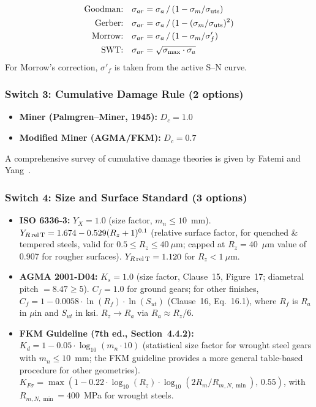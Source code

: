 \documentclass[twocolumn,12pt,a4paper]{article}
\begin{document}
\begin{subequations}\label{eq:mean_stress}
\begin{align}
\text{Goodman:}\quad
  \sigma_{ar} &= \sigma_a \,/\, (1 - \sigma_m/\sigma_{\rm uts})
  \label{eq:goodman} \\
\text{Gerber:}\quad
  \sigma_{ar} &= \sigma_a \,/\, (1 - (\sigma_m/\sigma_{\rm uts})^2)
  \label{eq:gerber} \\
\text{Morrow:}\quad
  \sigma_{ar} &= \sigma_a \,/\, (1 - \sigma_m/\sigma'_f)
  \label{eq:morrow} \\
\text{SWT:}\quad
  \sigma_{ar} &= \sqrt{\sigma_{\max} \cdot \sigma_a}
  \label{eq:swt}
\end{align}
\end{subequations}
For Morrow's correction, $\sigma'_f$ is taken from the active S--N
curve.

\subsubsection{Switch 3: Cumulative Damage Rule (2 options)}

\begin{itemize}
  \item \textbf{Miner (Palmgren--Miner, 1945):} $D_c = 1.0$
  \item \textbf{Modified Miner (AGMA/FKM):} $D_c = 0.7$
\end{itemize}
A comprehensive survey of cumulative damage theories is given by Fatemi and Yang~\cite{fatemi1998}.

\subsubsection{Switch 4: Size and Surface Standard (3 options)}

\begin{itemize}
  \item \textbf{ISO 6336-3:} $Y_X = 1.0$ (size factor, $m_n \leq 10$~mm).
        $Y_{R\,\rm rel\,T} = 1.674 - 0.529(R_z+1)^{0.1}$ (relative
        surface factor, for quenched \& tempered steels, valid for
        $0.5 \leq R_z \leq 40~\mu$m; capped at $R_z=40$~$\mu$m value
        of 0.907 for rougher surfaces). $Y_{R\,\rm rel\,T} = 1.120$
        for $R_z < 1~\mu$m.
  \item \textbf{AGMA 2001-D04:} $K_s = 1.0$ (size factor, Clause~15,
        Figure~17; diametral pitch $=8.47 \geq 5$).
        $C_f = 1.0$ for ground gears; for other finishes,
        $C_f = 1 - 0.0058 \cdot \ln(R_f) \cdot \ln(S_{ut})$
        (Clause~16, Eq.~16.1), where $R_f$ is $R_a$ in $\mu$in
        and $S_{ut}$ in ksi. $R_z \rightarrow R_a$ via
        $R_a \approx R_z/6$.
  \item \textbf{FKM Guideline (7th ed., Section~4.4.2):}
        $K_d = 1 - 0.05 \cdot \log_{10}(m_n \cdot 10)$ (statistical size
        factor for wrought steel gears with $m_n \leq 10$~mm;
        the FKM guideline provides a more general table-based procedure
        for other geometries).
        $K_{F\sigma} = \max(1 - 0.22 \cdot \log_{10}(R_z) \cdot
        \log_{10}(2R_m/R_{m,N,\min}),\, 0.55)$, with
        $R_{m,N,\min}=400$~MPa for wrought steels.
\end{itemize}
\end{document}
